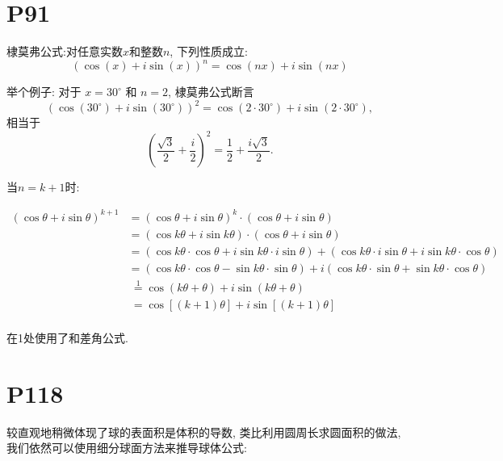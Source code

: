 \documentclass{book}
\begin{document}
    \section{\textcolor[rgb]{0.11,0.65,0.52}{P91}}
    \begin{boxB}
        棣莫弗公式:对任意实数${\displaystyle x}$和整数${\displaystyle n}$, 下列性质成立: $$( \cos (x) + i \sin (x) )^n = \cos (nx) + i \sin (nx)$$
    \end{boxB}
    举个例子: 对于 ${\displaystyle x=30^{\circ }}$ 和 ${\displaystyle n=2}$, 棣莫弗公式断言 $${\displaystyle \left(\cos(30^{\circ })+i\sin(30^{\circ })\right)^{2}=\cos(2\cdot 30^{\circ })+i\sin(2\cdot 30^{\circ }),}$$相当于$${\displaystyle \left({\frac {\sqrt {3}}{2}}+{\frac {i}{2}}\right)^{2}={\frac {1}{2}}+{\frac {i{\sqrt {3}}}{2}}.}$$

    当$n=k+1$时:

${\displaystyle {\begin{aligned}(\cos \theta +i\sin \theta )^{k+1}&=(\cos \theta +i\sin \theta )^{k}\cdot (\cos \theta +i\sin \theta )\\&=(\cos k\theta +i\sin k\theta )\cdot (\cos \theta +i\sin \theta )\\&=(\cos k\theta \cdot \cos \theta +i\sin k\theta \cdot i\sin \theta )+(\cos k\theta \cdot i\sin \theta +i\sin k\theta \cdot \cos \theta )\\&=(\cos k\theta \cdot \cos \theta -\sin k\theta \cdot \sin \theta )+i(\cos k\theta \cdot \sin \theta +\sin k\theta \cdot \cos \theta )\\&\ {\overset {1}{=}}\cos(k\theta +\theta )+i\sin(k\theta +\theta )\\&\ =\cos[(k+1)\theta ]+i\sin[(k+1)\theta ]\\\end{aligned}}}$

    在1处使用了和差角公式.

    \section{\textcolor[rgb]{0.11,0.65,0.52}{P118}}
    较直观地稍微体现了球的表面积是体积的导数, 类比利用圆周长求圆面积的做法, 我们依然可以使用细分球面方法来推导球体公式:
\end{document}
